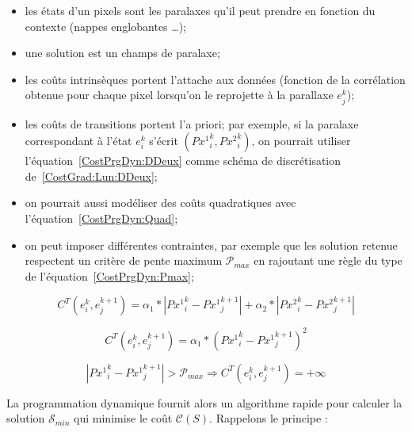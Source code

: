 {\begin{itemize}
    \item les \'etats d'un pixels sont les paralaxes qu'il peut prendre 
          en fonction du contexte (nappes englobantes \dots);

    \item une solution est un champs de paralaxe;

    \item les co\^uts intrins\`eques portent  l'attache
          aux donn\'ees (fonction de la corr\'elation obtenue pour chaque pixel
	  lorsqu'on le reprojette \`a la parallaxe $e^k_j$);

    \item les co\^uts  de transitions  portent  l'a priori;
          par exemple, si la paralaxe correspondant \`a 
	  l'\'etat $e^k_i$  s'\'ecrit $({Px^1}^k_i,{Px^2}^k_i)$, on pourrait
	  utiliser l'\'equation~\ref{CostPrgDyn:DDeux} comme sch\'ema de
	  discr\'etisation de~\ref{CostGrad:Lun:DDeux}; 
	  
    \item on pourrait  aussi  mod\'eliser des co\^uts quadratiques avec
          l'\'equation~\ref{CostPrgDyn:Quad};
 
    \item on peut imposer diff\'erentes contraintes, par exemple
           que les solution retenue respectent un crit\`ere
          de pente maximum $ \mathcal P_{max}$  en rajoutant une r\`egle du type 
	  de l'\'equation~\ref{CostPrgDyn:Pmax};


\end{itemize}


\begin{equation}
\label{CostPrgDyn:DDeux}
C^T(e^k_i,e^{k+1}_j) =    \alpha_1* |{Px^1}^k_i-{Px^1}^{k+1}_j|
                          + \alpha_2* |{Px^2}^k_i-{Px^2}^{k+1}_j|
\end{equation}

\begin{equation}
\label{CostPrgDyn:Quad}
C^T(e^k_i,e^{k+1}_j) =    \alpha_1* ({Px^1}^k_i-{Px^1}^{k+1}_j)^2
\end{equation}

\begin{equation}
\label{CostPrgDyn:Pmax}
   |{Px^1}^k_i-{Px^1}^{k+1}_j| > \mathcal P_{max} \Rightarrow  C^T(e^k_i,e^{k+1}_j) = + \infty
\end{equation}


La programmation dynamique fournit alors un algorithme rapide pour
calculer la solution $\mathcal S_{min} $ qui minimise le 
co\^ut $ \mathcal C (S) $.
Rappelons le principe :

}
